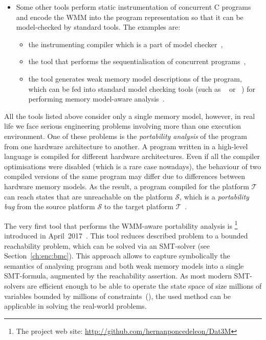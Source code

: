 \begin{itemize}[noitemsep,topsep=0pt,leftmargin=\parindent]
\item Some other tools perform static instrumentation of concurrent C programs and encode the WMM into the program representation so that it can be model-checked by standard tools.
The examples are:
\begin{itemize}[noitemsep,topsep=0pt]
\item the instrumenting compiler  which is a part of  model checker~\cite{kroening2014cbmc},
\item the tool that performs the sequentialisation of concurrent programs~\cite{alglave2013software},
\item the tool  generates weak memory model descriptions of the program, which can be fed into standard model checking tools (such as ~\cite{holzmann1997model} or ~\cite{cimatti2000nusmv}) for performing memory model-aware analysis~\cite{travkin2016verification}.
\end{itemize}

\end{itemize}


All the tools listed above consider only a single memory model, however, in real life we face serious engineering problems involving more than one execution environment.
One of these problems is the \textit{portability analysis} of the program from one hardware architecture to another.
A program written in a high-level language is compiled for different hardware architectures.
Even if all the compiler optimisations were disabled (which is a rare case nowadays), the behaviour of two compiled versions of the same program may differ due to differences between hardware memory models.
As the result, a program compiled for the platform $\mathcal{T}$ can reach states that are unreachable on the platform $\mathcal{S}$, which is a \textit{portability bug} from the source platform $\mathcal{S}$ to the target platform $\mathcal{T}$~\cite{Porthos17a}.

The very first tool that performs the WMM-aware portability analysis is \porthos{}%
%
\footnote{The \porthos{} project web site: \url{http://github.com/hernanponcedeleon/Dat3M}} %
%
introduced in April~2017~\cite{Porthos17a}.
This tool reduces described problem to a bounded reachability problem, which can be solved via an SMT-solver (see Section~\ref{ch:enc:bmc}).
This approach allows to capture symbolically the semantics of analysing program and both weak memory models into a single SMT-formula, augmented by the reachability assertion.
As most modern SMT-solvers are efficient enough to be able to operate the state space of size millions of variables bounded by millions of constraints~(\cite{malik2009boolean}), the used method can be applicable in solving the real-world problems.

